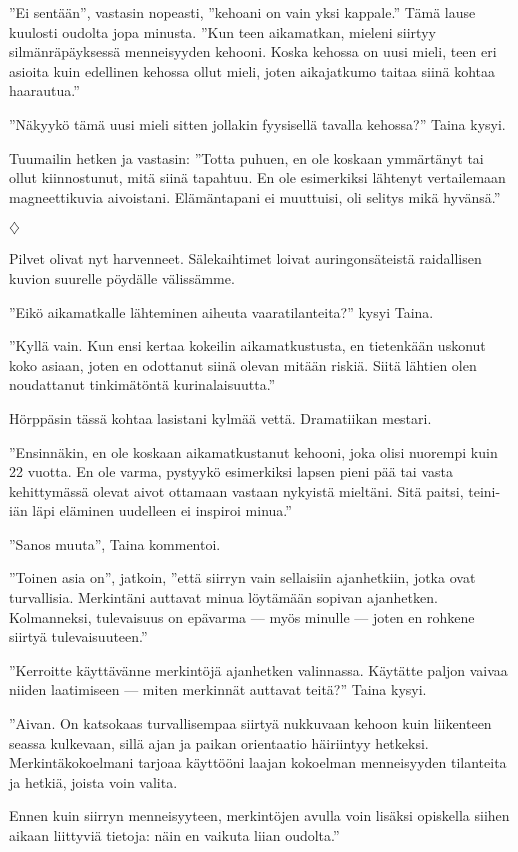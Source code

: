 ﻿\documentclass[a4paper, 12pt, finnish]{article}
\newcommand{\q}[1]{''#1''}
\def\jump{\vspace{2mm} \centerline{$\diamondsuit$} \vspace{2mm}}
\begin{document}
\q{Ei sentään}, vastasin nopeasti, \q{kehoani on vain yksi kappale.}
Tämä lause kuulosti oudolta jopa minusta.
\q{Kun teen aikamatkan,
mieleni siirtyy silmänräpäyksessä menneisyyden kehooni. Koska kehossa on
uusi mieli, teen eri asioita kuin edellinen kehossa ollut mieli,
joten aikajatkumo taitaa siinä kohtaa haarautua.}

\q{Näkyykö tämä uusi mieli sitten jollakin fyysisellä tavalla kehossa?} Taina kysyi.

Tuumailin hetken ja vastasin: \q{Totta puhuen, en ole koskaan ymmärtänyt
tai ollut kiinnostunut, mitä siinä tapahtuu. En ole esimerkiksi
lähtenyt vertailemaan magneettikuvia aivoistani. Elämäntapani ei
muuttuisi, oli selitys mikä hyvänsä.}


\jump


Pilvet olivat nyt harvenneet. Sälekaihtimet loivat auringonsäteistä
raidallisen kuvion suurelle pöydälle välissämme.

\q{Eikö aikamatkalle lähteminen aiheuta vaaratilanteita?} kysyi Taina.

\q{Kyllä vain. Kun ensi kertaa kokeilin aikamatkustusta, en tietenkään uskonut
koko asiaan, joten en odottanut siinä olevan mitään riskiä. Siitä lähtien
olen noudattanut tinkimätöntä kurinalaisuutta.}

Hörppäsin tässä kohtaa lasistani kylmää vettä. Dramatiikan mestari.

\q{Ensinnäkin, en ole koskaan
aikamatkustanut kehooni, joka olisi nuorempi kuin 22 vuotta.
En ole varma, pystyykö esimerkiksi lapsen pieni pää tai
vasta kehittymässä olevat aivot ottamaan vastaan nykyistä mieltäni.
Sitä paitsi, teini-iän läpi eläminen uudelleen ei inspiroi minua.}

\q{Sanos muuta}, Taina kommentoi.

\q{Toinen asia on}, jatkoin, \q{että siirryn vain sellaisiin
ajanhetkiin, jotka ovat turvallisia. Merkintäni auttavat minua
löytämään sopivan ajanhetken. Kolmanneksi, tulevaisuus on
epävarma --- myös minulle --- joten
en rohkene siirtyä tulevaisuuteen.} 

\q{Kerroitte käyttävänne merkintöjä ajanhetken valinnassa.
Käytätte paljon vaivaa niiden laatimiseen --- miten merkinnät
auttavat teitä?} Taina kysyi.

\q{Aivan. On katsokaas turvallisempaa siirtyä nukkuvaan kehoon
kuin liikenteen seassa kulkevaan,
sillä ajan ja paikan orientaatio häiriintyy hetkeksi.
Merkintäkokoelmani tarjoaa käyttööni laajan kokoelman
menneisyyden tilanteita ja hetkiä, joista voin valita.

Ennen kuin siirryn menneisyyteen, merkintöjen avulla voin lisäksi opiskella
siihen aikaan liittyviä tietoja: näin en vaikuta liian oudolta.}
\end{document}
